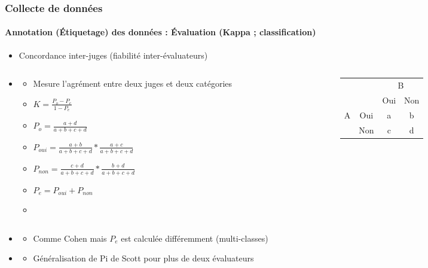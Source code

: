 \documentclass[xcolor=table]{beamer}
\begin{document}
\begin{frame}
	\frametitle{Collecte de données}
	\framesubtitle{Annotation (Étiquetage) des données : Évaluation (Kappa ; classification)}
	
	\begin{itemize}
		\item Concordance inter-juges (fiabilité inter-évaluateurs) 
	\end{itemize}

\begin{columns}
\begin{column}{0.6\textwidth}
	\begin{itemize}
		\item {}
		\begin{itemize}
			\item Mesure l'agrément entre deux juges et deux catégories
			\item $K = \frac{P_o - P_e}{1 - P_e}$
			\item $P_o = \frac{a + d}{a+b+c+d}$
			\item $P_{oui} = \frac{a+b}{a+b+c+d} * \frac{a+c}{a+b+c+d}$
			\item $P_{non} = \frac{c+d}{a+b+c+d} * \frac{b+d}{a+b+c+d}$
			\item $P_e = P_{oui} + P_{non}$
			\item {}
		\end{itemize}
	\end{itemize}
\end{column}
\begin{column}{0.4\textwidth}
	\begin{tabular}{|c|c|c|c|}
		\cline{3-4}
		\multicolumn{2}{c|}{}& \multicolumn{2}{c|}{B} \\
		\cline{3-4}
		\multicolumn{2}{c|}{}& Oui & Non \\
		\hline
		\multirow{2}{*}{A} & Oui & a & b \\
		\cline{2-4}
		& Non & c & d \\
		\hline
	\end{tabular}
\end{column}
\end{columns}

\begin{itemize}
	\item {}
	\begin{itemize}
		\item Comme Cohen mais $P_e$ est calculée différemment (multi-classes)
	\end{itemize}
	\item {}
	\begin{itemize}
		\item Généralisation de Pi de Scott pour plus de deux évaluateurs
	\end{itemize}
\end{itemize}

\end{frame}
\end{document}
